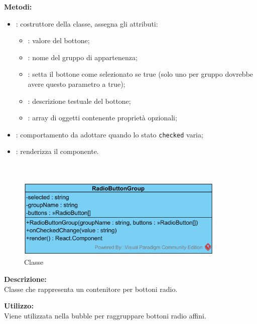 \textbf{Metodi:}
\begin{itemize}
	\item {}: costruttore della classe, assegna gli attributi:
	\begin{itemize}
		\item {}: valore del bottone;
		\item {}: nome del gruppo di appartenenza;
		\item {}: setta il bottone come selezionato se true (solo uno per gruppo dovrebbe avere questo parametro a true);
		\item {}: descrizione testuale del bottone;
		\item {}: array di oggetti contenente proprietà opzionali;
	\end{itemize}
	\item {}: comportamento da adottare quando lo stato \texttt{checked} varia;
	\item {}: renderizza il componente.
\end{itemize}

\paragraph[::RadioButtonGroup]{\class}\mbox{}\\ \label{\class}
\begin{figure}[H]
	\centering
	\includegraphics[width=10cm]{./diagrammi/framework/view/gui/radiobuttongroup.png}
	\caption{Classe \class}
\end{figure}
\textbf{Descrizione:}\\
Classe che rappresenta un contenitore per bottoni radio.

\textbf{Utilizzo:}\\
Viene utilizzata nella bubble per raggruppare bottoni radio affini.

